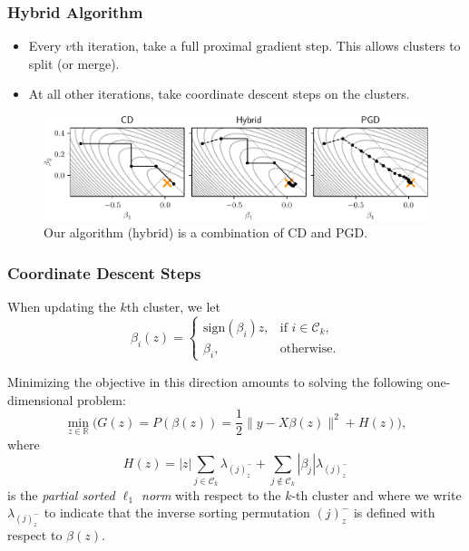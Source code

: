 \begin{frame}[c]
  \frametitle{Hybrid Algorithm}

  \begin{itemize}
    \item Every \(v\)th iteration, take a full proximal gradient step. This allows clusters to split
          (or merge).
    \item At all other iterations, take coordinate descent steps on the clusters.
  \end{itemize}

  \pause

  \begin{figure}[htpb]
    \centering
    \includegraphics[width=\textwidth]{figures/illustration_solvers.pdf}
    \caption{%
      Our algorithm (hybrid) is a combination of CD and PGD.
    }
    \label{fig:illustration}
  \end{figure}

\end{frame}

\begin{frame}
  \frametitle{Coordinate Descent Steps}

  When updating the \(k\)th cluster, we let
  \begin{equation*}
    \beta_i(z) =
    \begin{cases}
      \mathrm{sign}(\beta_i) z   , & \text{if } i \in \mathcal{C}_k, \\
      \beta_i,                     & \text{otherwise}.
    \end{cases}
  \end{equation*}

  \pause

  Minimizing the objective in this direction amounts to solving the following one-dimensional
  problem:
  \[
    \min_{z \in \mathbb{R}} \Big(
    G(z) = P(\beta(z))  = \frac{1}{2} \lVert y - X \beta(z)\rVert^2 + H(z)
    \Big),
  \]
  where
  \begin{equation*}
    H(z) = |z| \sum_{j \in \mathcal{C}_k} \lambda_{(j)^-_z}
    + \sum_{j \notin \mathcal{C}_k} |\beta_j| \lambda_{(j)^-_z}
  \end{equation*}
  is the \emph{partial sorted \(\ell_1\) norm} with respect to the \(k\)-th cluster and where we write \(\lambda_{(j)^-_z}\) to indicate that the inverse sorting permutation \((j)^-_z\)
  is defined with respect to \(\beta(z)\).
\end{frame}

